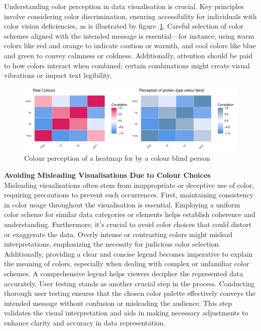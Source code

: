 \documentclass{article}\usepackage[]{graphicx}\usepackage[]{xcolor}
\makeatletter
\def\maxwidth{ %
  \ifdim\Gin@nat@width>\linewidth
    \linewidth
  \else
    \Gin@nat@width
  \fi
}
\newenvironment{knitrout}{}{} %
\makeatother
\begin{document}
\noindent
Understanding color perception in data visualisation is crucial. Key principles involve considering color discrimination, ensuring accessibility for individuals with color vision deficiencies, as is illustrated by figure~\ref{fig:colour-plot}. Careful selection of color schemes aligned with the intended message is essential—for instance, using warm colors like red and orange to indicate caution or warmth, and cool colors like blue and green to convey calmness or coldness. Additionally, attention should be paid to how colors interact when combined; certain combinations might create visual vibrations or impact text legibility.\\

\begin{knitrout}\scriptsize
{}\color{fgcolor}\begin{figure}[H]

{\centering \includegraphics[width=\maxwidth]{figure/beamer-colour-plot-1} 

}

\caption[Colour perception of a heatmap for by a colour blind person]{Colour perception of a heatmap for by a colour blind person}\label{fig:colour-plot}
\end{figure}

\end{knitrout}

\noindent 
\textbf{Avoiding Misleading Visualisations Due to Colour Choices}\\
Misleading visualisations often stem from inappropriate or deceptive use of color, requiring precautions to prevent such occurrences. First, maintaining consistency in color usage throughout the visualisation is essential. Employing a uniform color scheme for similar data categories or elements helps establish coherence and understanding. Furthermore, it's crucial to avoid color choices that could distort or exaggerate the data. Overly intense or contrasting colors might mislead interpretations, emphasizing the necessity for judicious color selection.\\
Additionally, providing a clear and concise legend becomes imperative to explain the meaning of colors, especially when dealing with complex or unfamiliar color schemes. A comprehensive legend helps viewers decipher the represented data accurately. User testing stands as another crucial step in the process. Conducting thorough user testing ensures that the chosen color palette effectively conveys the intended message without confusion or misleading the audience. This step validates the visual interpretation and aids in making necessary adjustments to enhance clarity and accuracy in data representation.
\end{document}
